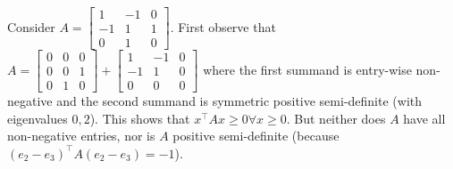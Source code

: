 \begin{enumerate}[leftmargin=*]
Consider $A = \begin{bmatrix}1&-1&0\\-1&1&1\\0&1&0\end{bmatrix}$. First observe that $A = \begin{bmatrix}0&0&0\\0&0&1\\0&1&0\end{bmatrix} + \begin{bmatrix}1&-1&0\\-1&1&0\\0&0&0\end{bmatrix}$ where the first summand is entry-wise non-negative and the second summand is symmetric positive semi-definite (with eigenvalues $0,2$). This shows that $x^\top Ax\geq 0\forall x\geq 0$. But neither does $A$ have all non-negative entries, nor is $A$ positive semi-definite (because $(e_2-e_3)^\top A(e_2-e_3) = -1$).
\end{enumerate}



